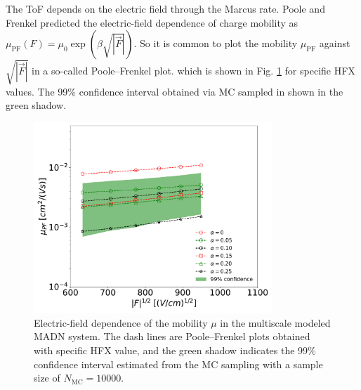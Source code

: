 \documentclass[letterpaper,12pt]{article}
\begin{document}
The ToF depends on the electric field through the Marcus rate. 
Poole and Frenkel predicted the electric-field dependence of charge mobility as $\mu_\text{PF}(F)=\mu_0 \exp (\beta \sqrt{|\vec{F}|})$.
So it is common to plot the mobility $\mu_\text{PF}$ against $\sqrt{|\vec{F}|}$ in a so-called Poole–Frenkel plot.
which is shown in Fig. \ref{fig:PF_plot_ave} for specifie HFX values. The 99\% confidence interval obtained via MC sampled in shown in the green shadow. 
%
\begin{figure}[H]
    \centering
    \includegraphics[width=0.8\textwidth]{figs/fig_PF_plot_ave.pdf}
    \caption{Electric-field dependence of the mobility $\mu$ in the multiscale modeled MADN system. The dash lines are Poole–Frenkel plots obtained with specific HFX value, and the green shadow indicates the 99\% confidence interval estimated from the MC sampling with a sample size of $N_\text{MC}=10000$.}
    \label{fig:PF_plot_ave}
\end{figure}
%




\end{document}
